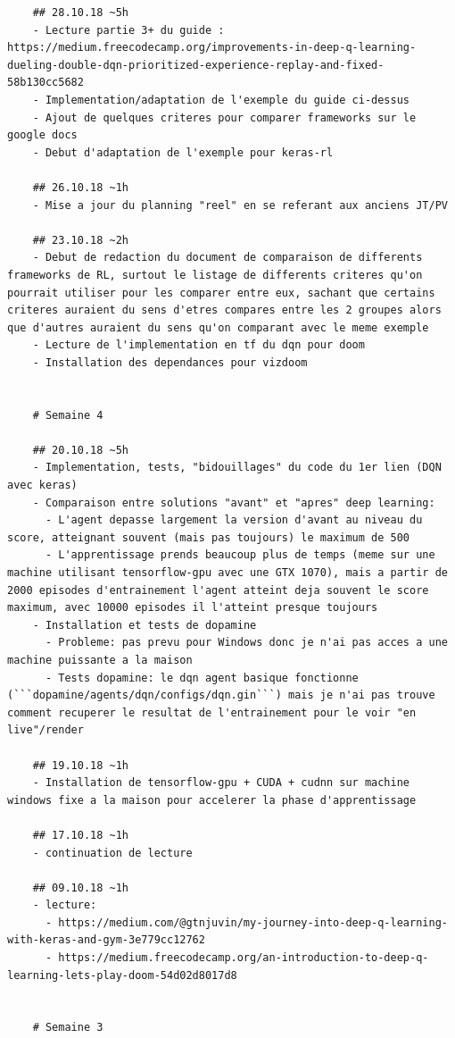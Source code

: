 \documentclass[a4paper,10pt,openany,oneside]{report}
\begin{document}
\begin{lstlisting}
	## 28.10.18 ~5h
	- Lecture partie 3+ du guide : https://medium.freecodecamp.org/improvements-in-deep-q-learning-dueling-double-dqn-prioritized-experience-replay-and-fixed-58b130cc5682
	- Implementation/adaptation de l'exemple du guide ci-dessus
	- Ajout de quelques criteres pour comparer frameworks sur le google docs
	- Debut d'adaptation de l'exemple pour keras-rl
	
	## 26.10.18 ~1h
	- Mise a jour du planning "reel" en se referant aux anciens JT/PV
	
	## 23.10.18 ~2h
	- Debut de redaction du document de comparaison de differents frameworks de RL, surtout le listage de differents criteres qu'on pourrait utiliser pour les comparer entre eux, sachant que certains criteres auraient du sens d'etres compares entre les 2 groupes alors que d'autres auraient du sens qu'on comparant avec le meme exemple
	- Lecture de l'implementation en tf du dqn pour doom
	- Installation des dependances pour vizdoom
	
	
	# Semaine 4
	
	## 20.10.18 ~5h
	- Implementation, tests, "bidouillages" du code du 1er lien (DQN avec keras)
	- Comparaison entre solutions "avant" et "apres" deep learning:
	  - L'agent depasse largement la version d'avant au niveau du score, atteignant souvent (mais pas toujours) le maximum de 500
	  - L'apprentissage prends beaucoup plus de temps (meme sur une machine utilisant tensorflow-gpu avec une GTX 1070), mais a partir de 2000 episodes d'entrainement l'agent atteint deja souvent le score maximum, avec 10000 episodes il l'atteint presque toujours
	- Installation et tests de dopamine
	  - Probleme: pas prevu pour Windows donc je n'ai pas acces a une machine puissante a la maison
	  - Tests dopamine: le dqn agent basique fonctionne (```dopamine/agents/dqn/configs/dqn.gin```) mais je n'ai pas trouve comment recuperer le resultat de l'entrainement pour le voir "en live"/render
	
	## 19.10.18 ~1h
	- Installation de tensorflow-gpu + CUDA + cudnn sur machine windows fixe a la maison pour accelerer la phase d'apprentissage
	
	## 17.10.18 ~1h
	- continuation de lecture
	
	## 09.10.18 ~1h
	- lecture:
	  - https://medium.com/@gtnjuvin/my-journey-into-deep-q-learning-with-keras-and-gym-3e779cc12762
	  - https://medium.freecodecamp.org/an-introduction-to-deep-q-learning-lets-play-doom-54d02d8017d8
	
	
	# Semaine 3
	

\end{lstlisting}
\end{document}

